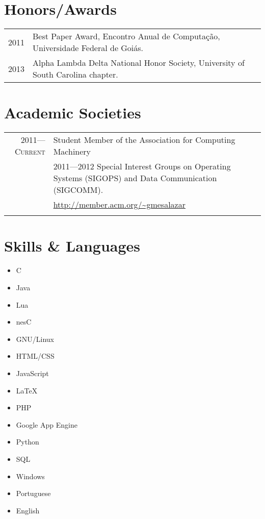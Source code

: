 \documentclass[a4paper,10pt]{article}
\begin{document}
\section{Honors/Awards}
\begin{tabular}{rll}
  2011 & Best Paper Award, Encontro Anual de Computação, Universidade Federal de Goiás.\\
  2013 & Alpha Lambda Delta National Honor Society, University of South Carolina chapter.\\
\end{tabular}

\section{Academic Societies}

\begin{tabular}{r|p{11cm}}
  \textsc{2011---Current}
  & Student Member of the Association for Computing Machinery\\
  & \footnotesize{\textsc{2011---2012} Special Interest Groups on Operating Systems (SIGOPS) and Data Communication (SIGCOMM).}\\
  & \footnotesize{\url{http://member.acm.org/~gmesalazar}}
  \\\multicolumn{2}{c}{}\\
\end{tabular}

\section{Skills \& Languages}
\begin{multicols}{3}
  \raggedcolumns
  \begin{itemize}
    \renewcommand{\labelitemi}{\textcolor{lightg}{\symbol{"00BB}}}
    \setlength{\itemsep}{1pt}
    \setlength{\parskip}{0pt}
    \setlength{\parsep}{0pt}
  \item C \hfill \threenotes 
  \item Java \hfill \threenotes
  \item Lua \hfill \twonotes
  \item nesC \hfill \twonotes
  \item GNU/Linux \hfill \threenotes
  \item HTML/CSS \hfill \threenotes
  \item JavaScript \hfill \twonotes
  \item \LaTeX \hfill \twonotes
  \item PHP \hfill \onenote
  \item Google App Engine \hfill \threenotes
  \item Python \hfill \twonotes
  \item SQL \hfill \twonotes
  \item Windows \hfill \threenotes
  \item Portuguese \hfill \fournotes
  \item English \hfill \threenotes
  \end{itemize}
\end{multicols}
\end{document}
